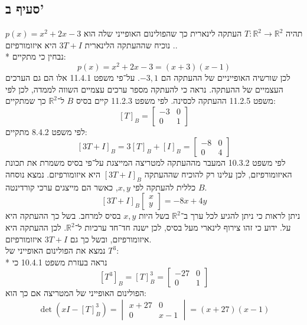 \documentclass[a4paper,10pt]{article}
\begin{document}
\subsection{סעיף ב'}
תהיה $T: \mathbb{R}^2 \to \mathbb{R}^2$ העתקה לינארית כך שהפולינום
האופייני שלה הוא $p(x) = x^2 + 2x - 3$.
נוכיח שההעתקה הלינארית $3T + I$ היא איזומורפיזם. \\*
נבחין כי מתקיים:
\[
	p(x) = x^2 + 2x - 3 = (x + 3)(x - 1)
\]
לכן שורשיה האופייניים של ההעתקה הם $-3, 1$.
על־פי משפט 11.4.1 אלו הם גם הערכים העצמיים של ההעתקה.
נראה כי להעתקה מספר ערכים עצמיים השווה לממדה,
לכן לפי משפט 11.2.5 ההעתקה לכסינה.
לפי משפט 11.2.3 קיים בסיס $B$ ל־$\mathbb{R}^2$ כך שמתקיים:
\[
	{[T]}_B =
	\begin{bmatrix}
		-3 & 0 \\
		0 & 1
	\end{bmatrix}
\]
לפי משפט 8.4.2 מתקיים:
\[
	{[3T + I]}_B =
3{[T]}_B + {[I]}_B =
	\begin{bmatrix}
		-8 & 0 \\
		0 & 4
	\end{bmatrix}
\]
לפי משפט 10.3.2 המעבר מההעתקה למטריצה המייצגת על־פי בסיס משמרת את תכונת
האיזומורפיזם, לכן עלינו רק להוכיח שההעתקה ${[3T + I]}_B$ היא איזומורפיזם.
נמצא נוסחה כללית להעתקה לפי $x, y$, כאשר הם מייצגים ערכי קורדינטה $B$.
\[
	{[3T + I]}_B \begin{bmatrix} x \\ y \end{bmatrix} =
	-8x + 4y
\]
ניתן לראות כי ניתן להגיע לכל ערך ב־$\mathbb{R}^2$ בשל היות
$x, y$ בסיס למרחב. בשל כך ההעתקה היא על.
ידוע כי זהו צירוף לינארי מעל בסיס, לכן ישנה חד־חד ערכיות ל־$\mathbb{R}^2$.
לכן ההעתקה היא איזומורפיזם, ובשל כך גם $3T + I$ איזומורפיזם. \\
נמצא את הפולינום האופייני של $T^3$: \\*
נראה בעזרת משפט 10.4.1 כי
\[
	{[T^3]}_B = {[T]}_B^3 =
	\begin{bmatrix}
		-27 & 0 \\
		0 & 1
	\end{bmatrix}
\]
הפולינום האופייני של המטריצה אם כך הוא:
\[
	\det(xI - {[T]}_B^3) =
	\begin{vmatrix}
		x + 27 & 0 \\
		0 & x - 1
	\end{vmatrix}
	= (x + 27)(x - 1)
\]
\end{document}
